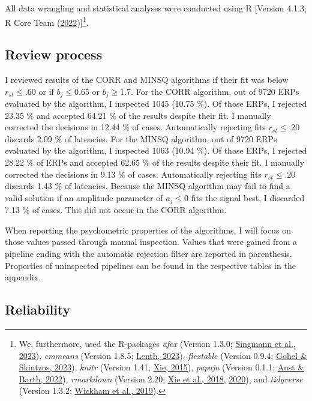 \documentclass[
  man]{apa7}
\begin{document}
All data wrangling and statistical analyses were conducted using R {[}Version 4.1.3; R Core Team (\protect\hyperlink{ref-R-base}{2022}){]}\footnote{We, furthermore, used the R-packages \emph{afex} (Version 1.3.0; \protect\hyperlink{ref-R-afex}{Singmann et al., 2023}), \emph{emmeans} (Version 1.8.5; \protect\hyperlink{ref-R-emmeans}{Lenth, 2023}), \emph{flextable} (Version 0.9.4; \protect\hyperlink{ref-R-flextable}{Gohel \& Skintzos, 2023}), \emph{knitr} (Version 1.41; \protect\hyperlink{ref-R-knitr}{Xie, 2015}), \emph{papaja} (Version 0.1.1; \protect\hyperlink{ref-R-papaja}{Aust \& Barth, 2022}), \emph{rmarkdown} (Version 2.20; \protect\hyperlink{ref-R-rmarkdown_a}{Xie et al., 2018}, \protect\hyperlink{ref-R-rmarkdown_b}{2020}), and \emph{tidyverse} (Version 1.3.2; \protect\hyperlink{ref-R-tidyverse}{Wickham et al., 2019}).}.

\hypertarget{review-process}{%
\subsection{Review process}\label{review-process}}

I reviewed results of the CORR and MINSQ algorithms if their fit was below \(r_{st} \le .60\) or if \(b_j \le 0.65\) or \(b_j \ge 1.7\). For the CORR algorithm, out of 9720 ERPs evaluated by the algorithm, I inspected 1045 (10.75 \%). Of those ERPs, I rejected 23.35 \% and accepted 64.21 \% of the results despite their fit. I manually corrected the decisions in 12.44 \% of cases. Automatically rejecting fits \(r_{st} \le .20\) discards 2.09 \% of latencies. For the MINSQ algorithm, out of 9720 ERPs evaluated by the algorithm, I inspected 1063 (10.94 \%). Of those ERPs, I rejected 28.22 \% of ERPs and accepted 62.65 \% of the results despite their fit. I manually corrected the decisions in 9.13 \% of cases. Automatically rejecting fits \(r_{st} \le .20\) discards 1.43 \% of latencies. Because the MINSQ algorithm may fail to find a valid solution if an amplitude parameter of \(a_j \le 0\) fits the signal best, I discarded 7.13 \% of cases. This did not occur in the CORR algorithm.

When reporting the psychometric properties of the algorithms, I will focus on those values passed through manual inspection. Values that were gained from a pipeline ending with the automatic rejection filter are reported in parenthesis. Properties of uninspected pipelines can be found in the respective tables in the appendix.

\hypertarget{reliability}{%
\subsection{Reliability}\label{reliability}}
\end{document}
